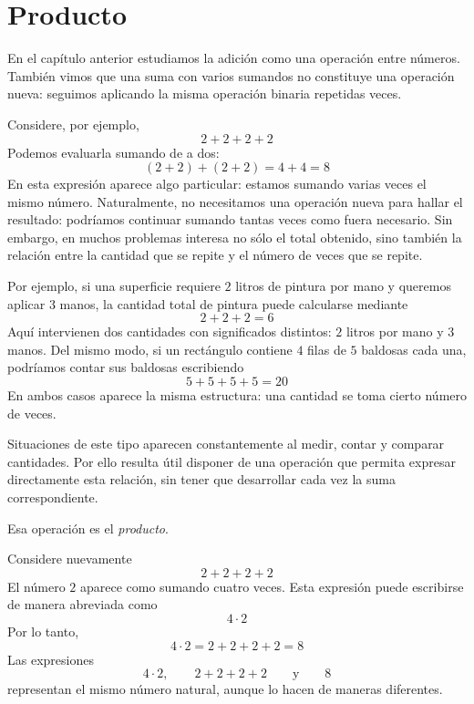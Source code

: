\chapter{Producto}

En el capítulo anterior estudiamos la adición como una operación entre números. También vimos que una suma con varios sumandos no constituye una operación nueva: seguimos aplicando la misma operación binaria repetidas veces.

Considere, por ejemplo,
\[
2+2+2+2
\]
Podemos evaluarla sumando de a dos:
\[
(2+2)+(2+2)=4+4=8
\]
En esta expresión aparece algo particular: estamos sumando varias veces el mismo número. Naturalmente, no necesitamos una operación nueva para hallar el resultado: podríamos continuar sumando tantas veces como fuera necesario. Sin embargo, en muchos problemas interesa no sólo el total obtenido, sino también la relación entre la cantidad que se repite y el número de veces que se repite.

Por ejemplo, si una superficie requiere \(2\) litros de pintura por mano y queremos aplicar \(3\) manos, la cantidad total de pintura puede calcularse mediante
\[
2+2+2=6
\]
Aquí intervienen dos cantidades con significados distintos: \(2\) litros por mano y \(3\) manos. Del mismo modo, si un rectángulo contiene \(4\) filas de \(5\) baldosas cada una, podríamos contar sus baldosas escribiendo
\[
5+5+5+5=20
\]
En ambos casos aparece la misma estructura: una cantidad se toma cierto número de veces.

Situaciones de este tipo aparecen constantemente al medir, contar y comparar cantidades. Por ello resulta útil disponer de una operación que permita expresar directamente esta relación, sin tener que desarrollar cada vez la suma correspondiente.

Esa operación es el \emph{producto}.

\begin{example}\label{ej_intro_producto}
Considere nuevamente
\[
2+2+2+2
\]
El número \(2\) aparece como sumando cuatro veces. Esta expresión puede escribirse de manera abreviada como
\[
4\cdot2
\]
Por lo tanto,
\[
4\cdot2
=
2+2+2+2
=
8
\]
Las expresiones
\[
4\cdot2,\qquad
2+2+2+2
\qquad\text{y}\qquad
8
\]
representan el mismo número natural, aunque lo hacen de maneras diferentes.
\end{example}
















